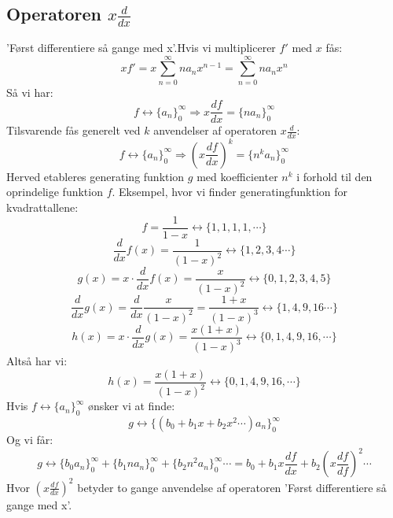 \subsection*{Operatoren \(x\frac {d}{dx}\)}
'Først differentiere så gange med x'.Hvis vi multiplicerer \(f'\) med \(x\) fås:
\[xf'=x\sum_{n=0}^{\infty}na_{n}x^{n-1}=\sum_{n=0}^{\infty}na_{n}x^{n}\]
Så vi har:
\[f \leftrightarrow \{a_{n}\}_{0}^{\infty} \Rightarrow x\frac{df}{dx}=\{na_{n}\}_{0}^{\infty}\]
Tilsvarende fås generelt ved \(k\) anvendelser af operatoren \(x\frac{d}{dx}\):
\[f \leftrightarrow \{a_{n}\}_{0}^{\infty} \Rightarrow (x\frac{df}{dx})^{k}=\{n^{k}a_{n}\}_{0}^{\infty}\]
Herved etableres generating funktion \(g\) med koefficienter \(n^{k}\) i forhold til den oprindelige funktion \(f\).
Eksempel, hvor vi finder generatingfunktion for kvadrattallene:
\[f=\frac{1}{1-x} \leftrightarrow \{1,1,1,1, \dotsm\}\]
\[\frac{d}{dx}f(x)=\frac{1}{(1-x)^{2}} \leftrightarrow \{1,2,3,4 \dotsm\}\]
\[g(x)=x \cdot \frac{d}{dx}f(x)=\frac{x}{(1-x)^{2}} \leftrightarrow \{0,1,2,3,4,5\}\]
\[\frac{d}{dx}g(x)=\frac{d}{dx}\frac{x}{(1-x)^{2}}=\frac{1+x}{(1-x)^{3}} \leftrightarrow \{1,4,9,16 \dotsm\}\]
\[h(x)=x \cdot \frac{d}{dx}g(x) =\frac{x(1+x)}{(1-x)^{3}} \leftrightarrow \{0,1,4,9,16, \dotsm\}\]
Altså har vi:
\[h(x)=\frac{x(1+x)}{(1-x)^{2}} \leftrightarrow \{0,1,4,9,16, \dotsm\}\]
Hvis \(f \leftrightarrow \{a_{n}\}_{0}^{\infty}\) ønsker vi at finde:
\[g \leftrightarrow \{(b_{0}+b_{1}x+b_{2}x^{2} \dotsm)a_{n}\}_{0}^{\infty}\]
Og vi får:
\[g \leftrightarrow \{b_{0}a_{n}\}_{0}^{\infty}+ \{b_{1}na_{n}\}_{0}^{\infty}+ \{b_{2}n^{2}a_{n}\}_{0}^{\infty} \dotsm=b_{0}+b_{1}x\frac{df}{dx}+b_{2}(x\frac{df}{df})^{2} \dotsm\]
Hvor \((x\frac{df}{dx})^{2}\) betyder to gange anvendelse af operatoren 'Først differentiere så gange med x'.\\





